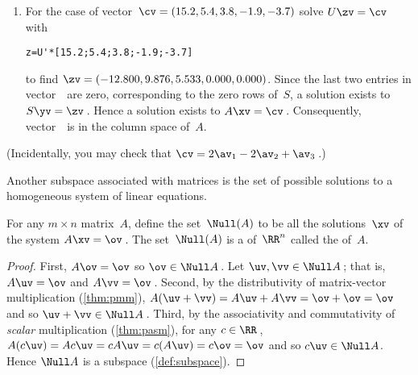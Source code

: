 \begin{example}
\begin{solution}
\begin{enumerate}
\item For the case of vector~\(\cv=(15.2,5.4,3.8,-1.9,-3.7)\) solve \(U\zv=\cv\) with 
\begin{verbatim}
z=U'*[15.2;5.4;3.8;-1.9;-3.7]
\end{verbatim}
to find \(\zv=(-12.800,9.876,5.533,0.000,0.000)\).
Since the last two entries in vector~\zv\ are zero, corresponding to the zero rows of~\(S\), a solution exists to \(S\yv=\zv\)\,.
Hence a solution exists to \(A\xv=\cv\)\,.
Consequently, vector~\cv\ is in the column space of~\(A\).

\end{enumerate}
(Incidentally, you may check that \(\cv=2\av_1-2\av_2+\av_3\)\,.)
\end{solution}
\end{example}






Another subspace associated with matrices is the set of possible solutions to a homogeneous system of linear equations.


\begin{theorem}\label{thm:homosubsp} 
For any $m\times n$ matrix~$A$, define the set~$\Null(A)$ to be all the solutions~$\xv$ of the  system $A\xv=\ov$\,. 
The set~\(\Null(A)\) is a  of~$\RR^n$ called the  of~$A$.
\end{theorem}
\begin{proof} 
First, \(A\ov=\ov\) so \(\ov\in\Null A\)\,.
Let \(\uv,\vv\in\Null A\)\,; that is, \(A\uv=\ov\) and \(A\vv=\ov\)\,.
Second, by the distributivity of matrix-vector multiplication (\autoref{thm:pmm}), \(A(\uv+\vv)=A\uv+A\vv=\ov+\ov=\ov\) and so \(\uv+\vv\in\Null A\)\,.
Third, by the associativity and commutativity of \emph{scalar} multiplication (\autoref{thm:pasm}), for any \(c\in\RR\)\,, \(A(c\uv)=Ac\uv=cA\uv=c(A\uv)=c\ov=\ov\) and so \(c\uv\in\Null A\). 
Hence \(\Null A\) is a subspace (\autoref{def:subspace}).
\end{proof}




